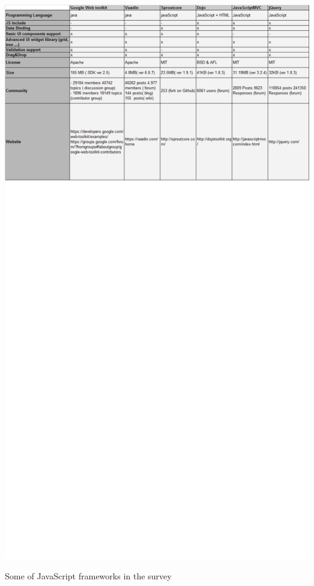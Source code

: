 \documentclass[14pt,a4paper]{extreport}
\begin{document}
			\begin{table}
				\begin{center}
					\includegraphics[scale=0.6]{JavaFrameTable1NewCriteria.png}
				
					\caption{Some of JavaScript frameworks in the survey}
				\end{center}
			
			\end{table}
\end{document}
